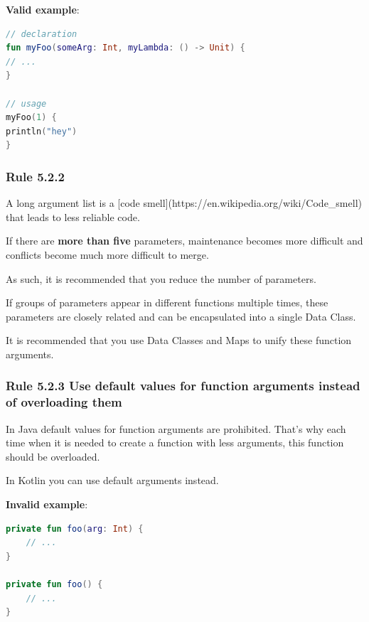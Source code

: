 {{{{\textbf{Valid example}:

\begin{lstlisting}[language=Kotlin]
// declaration
fun myFoo(someArg: Int, myLambda: () -> Unit) {
// ...
}

// usage
myFoo(1) {
println("hey")
}
\end{lstlisting}


\subsubsection*{\textbf{Rule 5.2.2}}
\leavevmode\newline



A long argument list is a [code smell](https://en.wikipedia.org/wiki/Code\_smell) that leads to less reliable code.

If there are \textbf{more than five} parameters, maintenance becomes more difficult and conflicts become much more difficult to merge.

As such, it is recommended that you reduce the number of parameters.

If groups of parameters appear in different functions multiple times, these parameters are closely related and can be encapsulated into a single Data Class.

It is recommended that you use Data Classes and Maps to unify these function arguments.



\subsubsection*{\textbf{Rule 5.2.3 Use default values for function arguments instead of overloading them}}
\leavevmode\newline

In Java default values for function arguments are prohibited. That's why each time when it is needed to create a function with less arguments, this function should be overloaded.

In Kotlin you can use default arguments instead.



\textbf{Invalid example}:

\begin{lstlisting}[language=Kotlin]
private fun foo(arg: Int) {
    // ...
}

private fun foo() {
    // ...
}
\end{lstlisting}


}}}}
